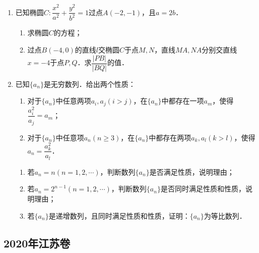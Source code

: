 \begin{description}
\begin{enumerate}[leftmargin=5pt]
        \item 已知椭圆$C:\dfrac{x^2}{a^2}+\dfrac{y^2}{b^2}=1$过点$A(-2,-1)$，且$a=2b$．
        \begin{enumerate}[label=(\arabic*)]
            \item 求椭圆$C$的方程；
            \item 过点$B(-4,0)$的直线$l$交椭圆$C$于点$M,N$，直线$MA,NA$分别交直线$x=-4$于点$P,Q$．求$\dfrac{|PB|}{|BQ|}$的值．
        \end{enumerate}

        \item 已知$\{a_n\}$是无穷数列．给出两个性质：
        \begin{enumerate}[label=\textcircled{\arabic*}]
            \item 对于$\{a_n\}$中任意两项$a_i,a_j(i>j)$，在$\{a_n\}$中都存在一项$a_m$，使得$\dfrac{a_i^2}{a_j}=a_m$；
            \item 对于$\{a_n\}$中任意项$a_n(n\geqslant 3)$，在$\{a_n\}$中都存在两项$a_k,a_l(k>l)$，使得$a_n=\dfrac{a_k^2}{a_l}$．
        \end{enumerate}
        \begin{enumerate}[label=(\arabic*)]
            \item 若$a_n=n(n=1,2,\cdots)$，判断数列$\{a_n\}$是否满足性质，说明理由；
            \item 若$a_n=2^{n-1}(n=1,2,\cdots)$，判断数列$\{a_n\}$是否同时满足性质和性质，说明理由；
            \item 若$\{a_n\}$是递增数列，且同时满足性质和性质，证明：$\{a_n\}$为等比数列．
        \end{enumerate}
    \end{enumerate}
\end{description}
\clearpage


\subsection{2020年江苏卷}\label{gk:2020年江苏卷}

